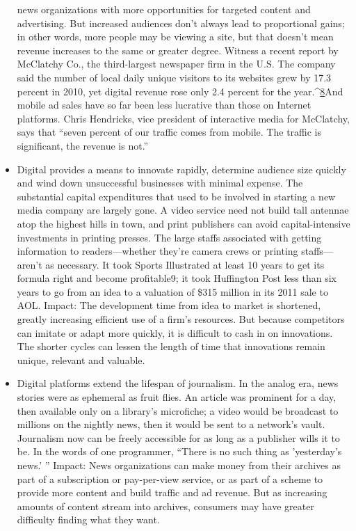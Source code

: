 \begin{itemize}
news organizations with more opportunities for targeted content and
advertising. But increased audiences don't always lead to proportional gains;
in other words, more people may be viewing a site, but that doesn't mean
revenue increases to the same or greater degree. Witness a recent report by
McClatchy Co., the third-largest newspaper firm in the U.S. The company
said the number of local daily unique visitors to its websites grew by 17.3
percent in 2010, yet digital revenue rose only 2.4 percent for the year.^{\href{#endnotes-chapter-1}{8}}And mobile ad sales have so far been less lucrative than those on Internet platforms.
Chris Hendricks, vice president of interactive media for McClatchy,
says that ``seven percent of our traffic comes from mobile. The traffic is significant,
the revenue is not.''
\item Digital provides a means to innovate rapidly, determine audience size
quickly and wind down unsuccessful businesses with minimal expense.
The substantial capital expenditures that used to be involved in
starting a new media company are largely gone. A video service need not
build tall antennae atop the highest hills in town, and print publishers can
avoid capital-intensive investments in printing presses. The large staffs associated
with getting information to readers—whether they're camera crews
or printing staffs—aren't as necessary. It took Sports Illustrated at least 10
years to get its formula right and become profitable9; it took Huffington
Post less than six years to go from an idea to a valuation of \$315 million in
its 2011 sale to AOL.
Impact: The development time from idea to market is shortened, greatly
increasing efficient use of a firm's resources. But because competitors can
imitate or adapt more quickly, it is difficult to cash in on innovations. The
shorter cycles can lessen the length of time that innovations remain unique,
relevant and valuable.
\item Digital platforms extend the lifespan of journalism. In the analog era, news
stories were as ephemeral as fruit flies. An article was prominent for a day, then
available only on a library's microfiche; a video would be broadcast to millions
on the nightly news, then it would be sent to a network's vault. Journalism
now can be freely accessible for as long as a publisher wills it to be. In the words
of one programmer, ``There is no such thing as 'yesterday's news.' ''
Impact: News organizations can make money from their archives as part
of a subscription or pay-per-view service, or as part of a scheme to provide
more content and build traffic and ad revenue. But as increasing amounts of
content stream into archives, consumers may have greater difficulty finding
what they want.
\end{itemize}
